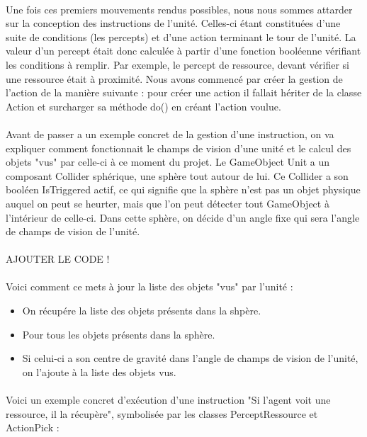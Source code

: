\documentclass{report}
\begin{document}
\paragraph{}Une fois ces premiers mouvements rendus possibles, nous nous sommes attarder sur la conception des instructions de l'unité. Celles-ci étant constituées d'une suite de conditions (les percepts) et d'une action terminant le tour de l'unité. La valeur d'un percept était donc calculée à partir d'une fonction booléenne vérifiant les conditions à remplir. Par exemple, le percept de ressource, devant vérifier si une ressource était à proximité. Nous avons commencé par créer la gestion de l'action de la manière suivante : pour créer une action il fallait hériter de la classe Action et surcharger sa méthode do() en créant l'action voulue.
\paragraph{}Avant de passer a un exemple concret de la gestion d'une instruction, on va expliquer comment fonctionnait le champs de vision d'une unité et le calcul des objets "vus" par celle-ci à ce moment du projet.
Le GameObject Unit a un composant Collider sphérique, une sphère tout autour de lui. Ce Collider a son booléen IsTriggered actif, ce qui signifie que la sphère n'est pas un objet physique auquel on peut se heurter, mais que l'on peut détecter tout GameObject à l'intérieur de celle-ci. Dans cette sphère, on décide d'un angle fixe qui sera l'angle de champs de vision de l'unité.
\paragraph{}
AJOUTER LE CODE !
\paragraph{}
Voici comment ce mets à jour la liste des objets "vus" par l'unité :
\begin{itemize}
\item On récupére la liste des objets présents dans la shpère.
\item Pour tous les objets présents dans la sphère.
\item Si celui-ci a son centre de gravité dans l'angle de champs de vision de l'unité, on l'ajoute à la liste des objets vus.
\end{itemize}
\paragraph{}Voici un exemple concret d'exécution d'une instruction "Si l'agent voit une ressource, il la récupère", symbolisée par les classes PerceptRessource et ActionPick :
\end{document}
